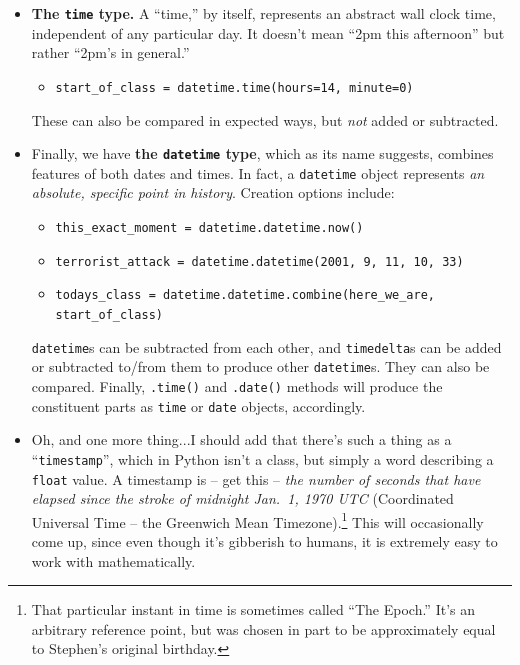 \begin{itemize}
    You can also compare dates with comparison operators like \texttt{<} and
\texttt{>=}.

\item \textbf{The \texttt{time} type.} A ``time,'' by itself, represents an
abstract wall clock time, independent of any particular day. It doesn't mean
``2pm this afternoon'' but rather ``2pm's in general.''
    \begin{itemize}
    \itemsep.1em
    \item \texttt{start\_of\_class = datetime.time(hours=14, minute=0)}
    \end{itemize}

    These can also be compared in expected ways, but \textit{not} added or
subtracted.

\item Finally, we have \textbf{the \texttt{datetime} type}, which as its name
suggests, combines features of both dates and times. In fact, a
\texttt{datetime} object represents \textit{an absolute, specific point in
history}. Creation options include:
\pagebreak
    \small
    \begin{itemize}
    \itemsep.1em
    \item \texttt{this\_exact\_moment = datetime.datetime.now()}
    \item \texttt{terrorist\_attack = datetime.datetime(2001, 9, 11, 10, 33)}
    \item \texttt{todays\_class = datetime.datetime.combine(here\_we\_are, start\_of\_class)}
    \end{itemize}
    \normalsize

    \texttt{datetime}s can be subtracted from each other, and
\texttt{timedelta}s can be added or subtracted to/from them to produce other
\texttt{datetime}s. They can also be compared. Finally, \texttt{.time()} and
\texttt{.date()} methods will produce the constituent parts as \texttt{time}
or \texttt{date} objects, accordingly.

\item Oh, and one more thing...I should add that there's such a thing as a
``\texttt{timestamp}'', which in Python isn't a class, but simply a word
describing a \texttt{float} value. A timestamp is -- get this -- \textit{the
number of seconds that have elapsed since the stroke of midnight Jan.~1, 1970
UTC} (Coordinated Universal Time -- the Greenwich Mean
Timezone).\footnote{That particular instant in time is sometimes called ``The
Epoch.'' It's an arbitrary reference point, but was chosen in part to be
approximately equal to Stephen's original birthday.} This will occasionally
come up, since even though it's gibberish to humans, it is extremely easy to
work with mathematically.

\end{itemize}


